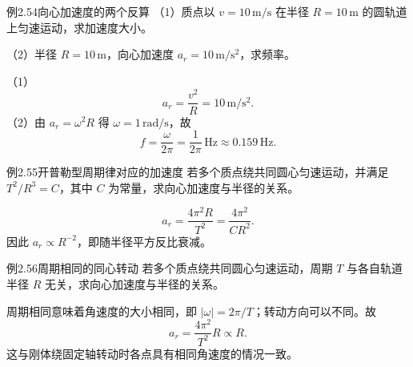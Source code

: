 \begin{origexamplebox}{例2.54\quad 向心加速度的两个反算}
（1）质点以 $v=10\,\mathrm{m/s}$ 在半径 $R=10\,\mathrm m$ 的圆轨道上匀速运动，求加速度大小。\par
（2）半径 $R=10\,\mathrm m$，向心加速度 $a_r=10\,\mathrm{m/s^2}$，求频率。
\end{origexamplebox}
\begin{xesolution}
（1）
\[
\boxed{a_r=\frac{v^2}{R}=10\,\mathrm{m/s^2}}.
\]
（2）由 $a_r=\omega^2R$ 得 $\omega=1\,\mathrm{rad/s}$，故
\[
 \boxed{f=\frac{\omega}{2\pi}=\frac1{2\pi}\,\mathrm{Hz}\approx0.159\,\mathrm{Hz}}.
\]
\end{xesolution}

\begin{origexamplebox}{例2.55\quad 开普勒型周期律对应的加速度}
若多个质点绕共同圆心匀速运动，并满足 $T^2/R^3=C$，其中 $C$ 为常量，求向心加速度与半径的关系。
\end{origexamplebox}
\begin{xesolution}
\[
a_r=\frac{4\pi^2R}{T^2}
=\boxed{\frac{4\pi^2}{CR^2}}.
\]
因此 $a_r\propto R^{-2}$，即随半径平方反比衰减。
\end{xesolution}

\begin{origexamplebox}{例2.56\quad 周期相同的同心转动}
若多个质点绕共同圆心匀速运动，周期 $T$ 与各自轨道半径 $R$ 无关，求向心加速度与半径的关系。
\end{origexamplebox}
\begin{xesolution}
周期相同意味着角速度的大小相同，即 $|\omega|=2\pi/T$；转动方向可以不同。故
\[
 \boxed{a_r=\frac{4\pi^2}{T^2}R\propto R}.
\]
这与刚体绕固定轴转动时各点具有相同角速度的情况一致。
\end{xesolution}

